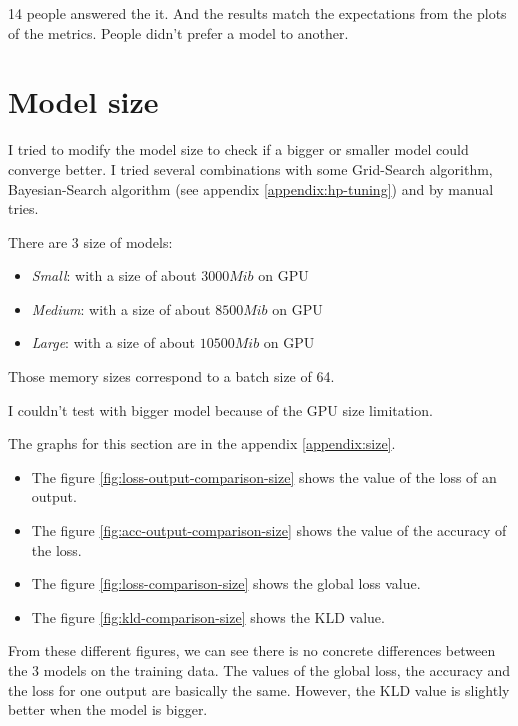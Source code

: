 \documentclass[12pt]{report}
\begin{document}
14 people answered the it.
And the results match the expectations from the plots of the metrics.
People didn't prefer a model to another.

\section{Model size}
\label{sec:exp:size}

I tried to modify the model size to check if a bigger or smaller model could converge better.
I tried several combinations with some Grid-Search algorithm, Bayesian-Search algorithm (see appendix \ref{appendix:hp-tuning}) and by manual tries.

There are 3 size of models:
\begin{itemize}
    \item \textit{Small}: with a size of about $3000Mib$ on GPU
    \item \textit{Medium}: with a size of about $8500Mib$ on GPU
    \item \textit{Large}: with a size of about $10500Mib$ on GPU
\end{itemize}
Those memory sizes correspond to a batch size of 64.

I couldn't test with bigger model because of the GPU size limitation.

The graphs for this section are in the appendix \ref{appendix:size}.
\begin{itemize}
    \item The figure \ref{fig:loss-output-comparison-size} shows the value of the loss of an output.
    \item The figure \ref{fig:acc-output-comparison-size} shows the value of the accuracy of the loss.
    \item The figure \ref{fig:loss-comparison-size} shows the global loss value.
    \item The figure \ref{fig:kld-comparison-size} shows the KLD value.
\end{itemize}

From these different figures, we can see there is no concrete differences between the 3 models on the training data.
The values of the global loss, the accuracy and the loss for one output are basically the same.
However, the KLD value is slightly better when the model is bigger.
\end{document}
